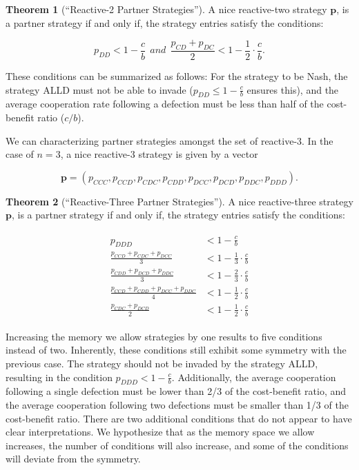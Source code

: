 \documentclass{article}
\theoremstyle{definition}
\newtheorem{theorem}{Theorem}[section]
\begin{document}
\begin{theorem}[``Reactive-2 Partner Strategies'']\label{theorem:reactive_two_partner_strategies}
A nice reactive-two strategy $\mathbf{p}$, is a partner strategy if and only if,
the strategy entries satisfy the conditions:

\begin{equation}\label{eq:two_bit_conditions}
  \displaystyle p_{DD} < 1\!-\! \frac{c}{b}  ~~and~~ \displaystyle \frac{p_{CD} + p_{DC}}{2} < 1- \frac{1}{2} \cdot \frac{c}{b}.
\end{equation}
\end{theorem}

These conditions can be summarized as follows: For the strategy to be Nash, the
strategy ALLD must not be able to invade ($p_{DD} \leq 1 - \frac{c}{b}$
ensures this), and the average cooperation rate following a defection must be
less than half of the cost-benefit ratio ($c/b$).

We can characterizing partner strategies amongst
the set of reactive-$3$. In the case of $n=3$, a nice reactive-3 strategy is
given by a vector

$$\mathbf{p}=(p_{CCC}, p_{CCD}, p_{CDC}, p_{CDD}, p_{DCC}, p_{DCD}, p_{DDC}, p_{DDD}).$$

\begin{theorem}[``Reactive-Three Partner Strategies'']\label{theorem:reactive_three_partner_strategies}
  A nice reactive-three strategy $\mathbf{p}$, is a partner strategy if and only if,
  the strategy entries satisfy the conditions:
  
  \begin{align}\label{eq:three_bit_conditions}
    \begin{split}
    p_{DDD} & < 1\!-\! \frac{c}{b} \\
    \frac{p_{CCD} + p_{CDC} + p_{DCC}}{3} & < 1\!-\! \frac{1}{3} \cdot \frac{c}{b} \\
    \frac{p_{CDD} + p_{DCD} + p_{DDC}}{3} & < 1\!-\! \frac{2}{3} \cdot \frac{c}{b} \\
    \frac{p_{CCD} + p_{CDD} + p_{DCC} + p_{DDC}}{4}  & < 1\!-\! \frac{1}{2} \cdot \frac{c}{b}  \\
    \frac{p_{CDC} + p_{DCD}}{2} & < 1\!-\! \frac{1}{2} \cdot \frac{c}{b}
    \end{split}
  \end{align}
\end{theorem}

Increasing the memory we allow strategies by one results to five conditions instead
of two. Inherently, these conditions still exhibit some symmetry with the
previous case. The strategy should not be invaded by the strategy ALLD,
resulting in the condition $p_{DDD} < 1 - \frac{c}{b}$. Additionally, the
average cooperation following a single defection must be lower than 2/3 of the
cost-benefit ratio, and the average cooperation following two defections must be
smaller than 1/3 of the cost-benefit ratio. There are two additional conditions
that do not appear to have clear interpretations. We hypothesize that as the
memory space we allow increases, the number of conditions will also increase,
and some of the conditions will deviate from the symmetry.
\end{document}

